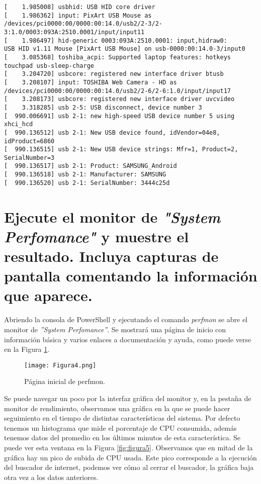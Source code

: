 \begin{verbatim}
[    1.985008] usbhid: USB HID core driver
[    1.986362] input: PixArt USB Mouse as 
/devices/pci0000:00/0000:00:14.0/usb2/2-3/2-3:1.0/0003:093A:2510.0001/input/input11
[    1.986497] hid-generic 0003:093A:2510.0001: input,hidraw0: 
USB HID v1.11 Mouse [PixArt USB Mouse] on usb-0000:00:14.0-3/input0
[    3.085368] toshiba_acpi: Supported laptop features: hotkeys touchpad usb-sleep-charge 
[    3.204720] usbcore: registered new interface driver btusb
[    3.208107] input: TOSHIBA Web Camera - HD as 
/devices/pci0000:00/0000:00:14.0/usb2/2-6/2-6:1.0/input/input17
[    3.208173] usbcore: registered new interface driver uvcvideo
[    3.318285] usb 2-5: USB disconnect, device number 3
[  990.006691] usb 2-1: new high-speed USB device number 5 using xhci_hcd
[  990.136512] usb 2-1: New USB device found, idVendor=04e8, idProduct=6860
[  990.136515] usb 2-1: New USB device strings: Mfr=1, Product=2, SerialNumber=3
[  990.136517] usb 2-1: Product: SAMSUNG_Android
[  990.136518] usb 2-1: Manufacturer: SAMSUNG
[  990.136520] usb 2-1: SerialNumber: 3444c25d
\end{verbatim}




\section{Ejecute el monitor de \textit{"System Perfomance"} y muestre el resultado. Incluya capturas de pantalla comentando la información que aparece.}

Abriendo la consola de PowerShell y ejecutando el comando \textit{perfmon} se abre el monitor de \textit{''System Perfomance''}. Se mostrará una página de inicio con
información básica y varios enlaces a documentación y ayuda, como puede verse en la Figura \ref{fig:figura4}.

\begin{figure}[H] 
\centering
\texttt{[image: Figura4.png]}  
\caption{Página inicial de perfmon.}\label{fig:figura4}
\end{figure}

Se puede navegar un poco por la interfaz gráfica del monitor y, en la pestaña de monitor de rendimiento, observamos una gráfica en la que se puede hacer
seguimiento en el tiempo de distintas características del sistema. Por defecto tenemos un histograma que mide el porcentaje de CPU consumida, 
además tenemos datos del promedio en los últimos minutos de esta característica. Se puede ver esta ventana en la Figura \ref{fig:figura5}. Observamos que en 
mitad de la gráfica hay un pico de subida de CPU usada. Este pico corresponde a la ejecución del buscador de internet, podemos ver cómo al cerrar el buscador, 
la gráfica baja otra vez a los datos anteriores.

